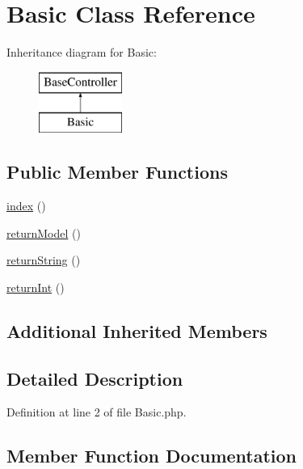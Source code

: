 \hypertarget{class_basic}{}\section{Basic Class Reference}
\label{class_basic}
Inheritance diagram for Basic\+:\begin{figure}[H]
\begin{center}
\leavevmode
\includegraphics[height=2.000000cm]{class_basic}
\end{center}
\end{figure}
\subsection*{Public Member Functions}
\begin{DoxyCompactItemize}
\item 
\hyperlink{class_basic_ac7cd2823d250de784f74ff852972e269}{index} ()
\item 
\hyperlink{class_basic_a68b47cdce3c867df841f6a29b8de624b}{return\+Model} ()
\item 
\hyperlink{class_basic_a00d093f162848a1bd2e6e48d7cd68ab0}{return\+String} ()
\item 
\hyperlink{class_basic_ade94a138ee91270bc419445603df2ec7}{return\+Int} ()
\end{DoxyCompactItemize}
\subsection*{Additional Inherited Members}


\subsection{Detailed Description}


Definition at line 2 of file Basic.\+php.



\subsection{Member Function Documentation}
\hypertarget{class_basic_ac7cd2823d250de784f74ff852972e269}{}\label{class_basic_ac7cd2823d250de784f74ff852972e269} 

